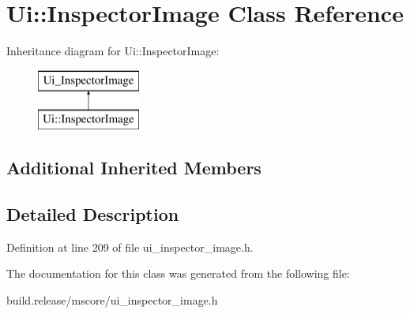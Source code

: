 \hypertarget{class_ui_1_1_inspector_image}{}\section{Ui\+:\+:Inspector\+Image Class Reference}
\label{class_ui_1_1_inspector_image}
Inheritance diagram for Ui\+:\+:Inspector\+Image\+:\begin{figure}[H]
\begin{center}
\leavevmode
\includegraphics[height=2.000000cm]{class_ui_1_1_inspector_image}
\end{center}
\end{figure}
\subsection*{Additional Inherited Members}


\subsection{Detailed Description}


Definition at line 209 of file ui\+\_\+inspector\+\_\+image.\+h.



The documentation for this class was generated from the following file\+:\begin{DoxyCompactItemize}
\item 
build.\+release/mscore/ui\+\_\+inspector\+\_\+image.\+h\end{DoxyCompactItemize}
